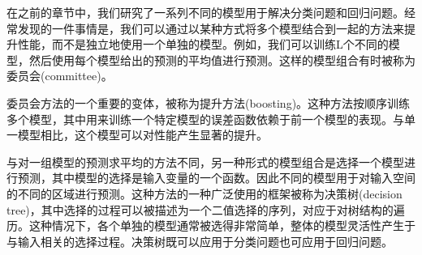 在之前的章节中，我们研究了一系列不同的模型用于解决分类问题和回归问题。经常发现的一件事情是，我们可以通过以某种方式将多个模型结合到一起的方法来提升性能，而不是独立地使用一个单独的模型。例如，我们可以训练L个不同的模型，然后使用每个模型给出的预测的平均值进行预测。这样的模型组合有时被称为委员会(committee)。

委员会方法的一个重要的变体，被称为提升方法(boosting)。这种方法按顺序训练多个模型，其中用来训练一个特定模型的误差函数依赖于前一个模型的表现。与单一模型相比，这个模型可以对性能产生显著的提升。

与对一组模型的预测求平均的方法不同，另一种形式的模型组合是选择一个模型进行预测，其中模型的选择是输入变量的一个函数。因此不同的模型用于对输入空间的不同的区域进行预测。这种方法的一种广泛使用的框架被称为决策树(decision tree)，其中选择的过程可以被描述为一个二值选择的序列，对应于对树结构的遍历。这种情况下，各个单独的模型通常被选得非常简单，整体的模型灵活性产生于与输入相关的选择过程。决策树既可以应用于分类问题也可应用于回归问题。